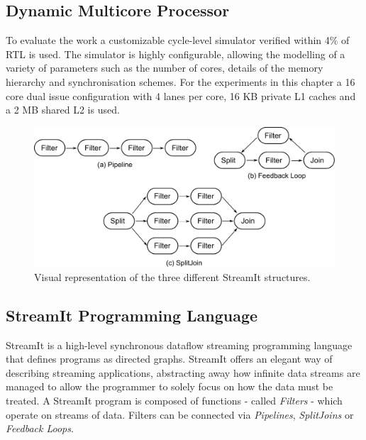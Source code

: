 \subsection{Dynamic Multicore Processor}

To evaluate the work a customizable cycle-level simulator verified within 4\% of RTL is used.
The simulator is highly configurable, allowing the modelling of a variety of parameters such as the number of cores, details of the memory hierarchy and synchronisation schemes.
For the experiments in this chapter a 16 core dual issue configuration with 4 lanes per core, 16 KB private L1 caches and a 2 MB shared L2 is used.

\begin{figure}
    \centering
    \includegraphics[width=1\textwidth]{streamit-paper/graphics/streamit_types.pdf}
    \caption{Visual representation of the three different StreamIt structures.}
    \label{fig:streamittypes}
\end{figure}
\subsection{StreamIt Programming Language}

StreamIt is a high-level synchronous dataflow streaming programming language that defines programs as directed graphs.
StreamIt offers an elegant way of describing streaming applications, abstracting away how infinite data streams are managed to allow the programmer to solely focus on how the data must be treated.
A StreamIt program is composed of functions - called \textit{Filters} - which operate on streams of data.
Filters can be connected via \textit{Pipelines}, \textit{SplitJoins} or \textit{Feedback Loops}.

